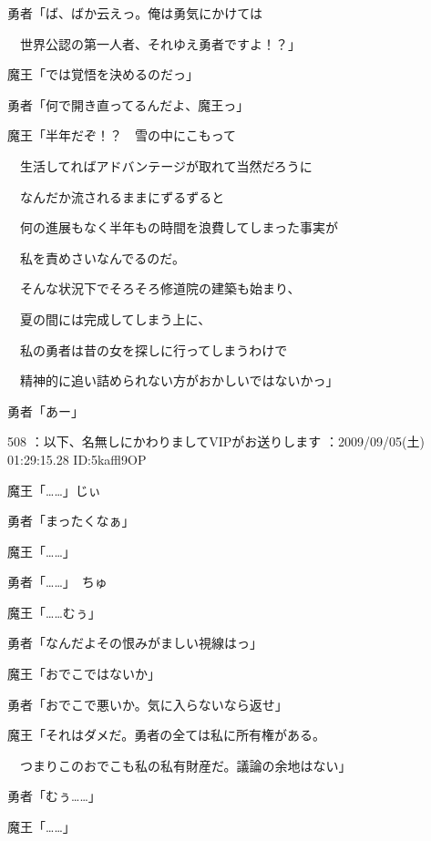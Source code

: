 \documentclass[a4j,twocolumn]{tarticle}
\begin{document}
勇者「ば、ばか云えっ。俺は勇気にかけては\par{} 
　世界公認の第一人者、それゆえ勇者ですよ！？」 



魔王「では覚悟を決めるのだっ」\par{} 
勇者「何で開き直ってるんだよ、魔王っ」 



魔王「半年だぞ！？　雪の中にこもって\par{} 
　生活してればアドバンテージが取れて当然だろうに\par{} 
　なんだか流されるままにずるずると\par{} 
　何の進展もなく半年もの時間を浪費してしまった事実が\par{} 
　私を責めさいなんでるのだ。\par{} 
　そんな状況下でそろそろ修道院の建築も始まり、\par{} 
　夏の間には完成してしまう上に、\par{} 
　私の勇者は昔の女を探しに行ってしまうわけで\par{} 
　精神的に追い詰められない方がおかしいではないかっ」 



勇者「あー」 

	

	

508 ：以下、名無しにかわりましてVIPがお送りします ：2009/09/05(土) 01:29:15.28 ID:5kaffl9OP 


魔王「……」じぃ\par{} 
勇者「まったくなぁ」 



魔王「……」\par{} 
勇者「……」　ちゅ 



魔王「……むぅ」\par{} 
勇者「なんだよその恨みがましい視線はっ」 



魔王「おでこではないか」 



勇者「おでこで悪いか。気に入らないなら返せ」 



魔王「それはダメだ。勇者の全ては私に所有権がある。\par{} 
　つまりこのおでこも私の私有財産だ。議論の余地はない」 



勇者「むぅ……」\par{} 
魔王「……」 
\end{document}
